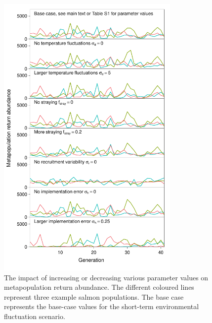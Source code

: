 \begin{figure}[htbp]
\centering
\includegraphics[width=3.5in]{metafolio/plot-various-options-ts-3pops}
\caption{The impact of increasing or decreasing various parameter values on
metapopulation return abundance. The different coloured lines represent three
example salmon populations. The base case represents the base-case values for
the short-term environmental fluctuation scenario.}
\label{f:eg-sens}
\end{figure}

\clearpage


